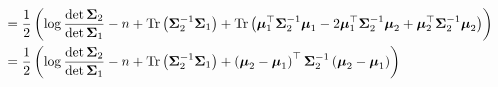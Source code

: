 \begin{align}
    \\
     &= \frac{1}{2}\left( \log\frac{\det\boldsymbol{\Sigma}_2}{\det\boldsymbol{\Sigma}_1} - n +\operatorname{Tr}\left(\boldsymbol{\Sigma}_2^{-1}\boldsymbol{\Sigma}_1\right) + \operatorname{Tr}\left(\boldsymbol{\mu}_1^\top\boldsymbol{\Sigma}_2^{-1}\boldsymbol{\mu}_1 - 2\boldsymbol{\mu}_1^\top\boldsymbol{\Sigma}_2^{-1}\boldsymbol{\mu}_2 + \boldsymbol{\mu}_2^\top\boldsymbol{\Sigma}_2^{-1}\boldsymbol{\mu}_2 \right)\right)
     \\
      &=\frac{1}{2}\left( \log\frac{\det\boldsymbol{\Sigma}_2}{\det\boldsymbol{\Sigma}_1} - n +\operatorname{Tr}\left(\boldsymbol{\Sigma}_2^{-1}\boldsymbol{\Sigma}_1\right) + \left(\boldsymbol{\mu}_2 - \boldsymbol{\mu}_1\right)^\top\boldsymbol{\Sigma}_2^{-1}\left(\boldsymbol{\mu}_2 - \boldsymbol{\mu}_1\right)\right)
\end{align}
